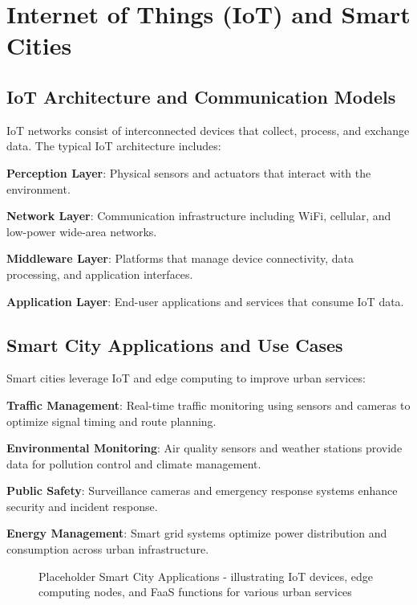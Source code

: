 \section{Internet of Things (IoT) and Smart Cities}

\subsection{IoT Architecture and Communication Models}

IoT networks consist of interconnected devices that collect, process, and exchange data. The typical IoT architecture includes:

\textbf{Perception Layer}: Physical sensors and actuators that interact with the environment.

\textbf{Network Layer}: Communication infrastructure including WiFi, cellular, and low-power wide-area networks.

\textbf{Middleware Layer}: Platforms that manage device connectivity, data processing, and application interfaces.

\textbf{Application Layer}: End-user applications and services that consume IoT data.

\subsection{Smart City Applications and Use Cases}

Smart cities leverage IoT and edge computing to improve urban services:

\textbf{Traffic Management}: Real-time traffic monitoring using sensors and cameras to optimize signal timing and route planning.

\textbf{Environmental Monitoring}: Air quality sensors and weather stations provide data for pollution control and climate management.

\textbf{Public Safety}: Surveillance cameras and emergency response systems enhance security and incident response.

\textbf{Energy Management}: Smart grid systems optimize power distribution and consumption across urban infrastructure.

\begin{figure}[h]
    \centering
    \caption{\small Placeholder Smart City Applications - illustrating IoT devices, edge computing nodes, and FaaS functions for various urban services}
    \label{fig:smart_city_applications}
\end{figure} 

